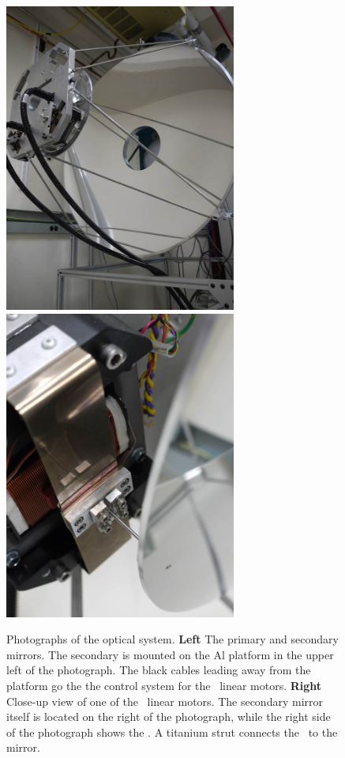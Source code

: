 \begin{figure}
\centering
\includegraphics[width=3in]{images/optics.jpg}
\includegraphics[width=3in]{images/optics-bose.jpg}
\caption{
  Photographs of the optical system.
  \textbf{Left} The primary and secondary mirrors.
  The secondary is mounted on the Al platform in the upper left of the photograph.
  The black cables leading away from the platform go the the control system for the \BOSE\ linear motors.
  \textbf{Right} Close-up view of one of the \BOSE\ linear motors.
  The secondary mirror itself is located on the right of the photograph, while the right side of the photograph shows the \BOSE.
  A titanium strut connects the \BOSE\ to the mirror.
}
\label{fig:ch4-optics}
\end{figure}

